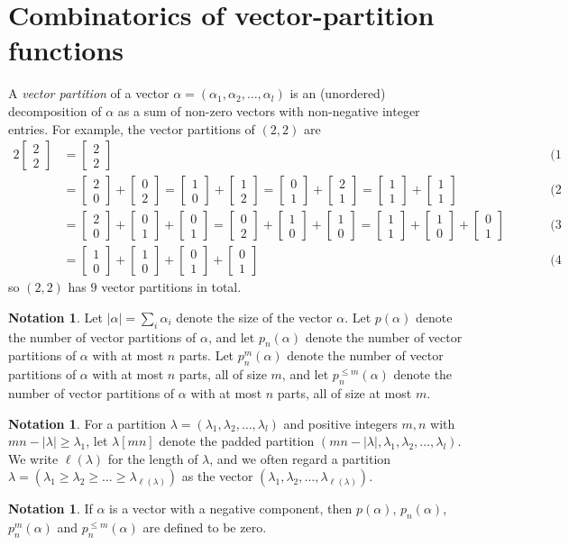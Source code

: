 \documentclass[reqno]{amsart}
\theoremstyle{plain}
\theoremstyle{definition}
\newtheorem{notation}[theorem]{Notation}
\theoremstyle{remark}
\theoremstyle{plain}
\newcommand{\vc}[2]{\begin{bmatrix}#1\\#2\end{bmatrix}}
\begin{document}
\section{Combinatorics of vector-partition functions}\label{sec-1}
A \emph{vector partition} of a vector $\alpha=(\alpha_1,\alpha_2,\ldots,\alpha_l)$
is an (unordered) decomposition of $\alpha$ as a sum of non-zero vectors with
non-negative integer entries. For example, the vector partitions of $(2,2)$ are
\begin{alignat*}{2}
\vc{2}{2} &= \vc{2}{2} && \text{(1 part)}\\[4pt]
&= \vc{2}{0}+\vc{0}{2}
 = \vc{1}{0}+\vc{1}{2}
 = \vc{0}{1}+\vc{2}{1}
 = \vc{1}{1}+\vc{1}{1} &\qquad& \text{(2 parts)}\\[4pt]
&= \vc{2}{0}+\vc{0}{1}+\vc{0}{1}
 = \vc{0}{2}+\vc{1}{0}+\vc{1}{0}
 = \vc{1}{1}+\vc{1}{0}+\vc{0}{1} && \text{(3 parts)}\\[4pt]
&= \vc{1}{0}+\vc{1}{0}+\vc{0}{1}+\vc{0}{1} && \text{(4 parts)}
\end{alignat*}
so $(2,2)$ has $9$ vector partitions in total.

\begin{notation}\label{notation-vec-par}
Let $|\alpha|=\sum_i\alpha_i$ denote the size of the vector $\alpha$. Let
$p(\alpha)$ denote the number of vector partitions of $\alpha$, and let
$p_n(\alpha)$ denote the number of vector partitions of $\alpha$ with at most
$n$ parts. Let $p_n^m(\alpha)$ denote the number of vector partitions of
$\alpha$ with at most $n$ parts, all of size $m$, and let
$p_n^{\leq m}(\alpha)$ denote the number of vector partitions of $\alpha$ with
at most $n$ parts, all of size at most $m$.
\end{notation}

\begin{notation}
For a partition $\lambda=(\lambda_1,\lambda_2,\dots,\lambda_l)$ and positive
integers $m,n$ with $mn-|\lambda|\geq\lambda_1$, let $\lambda[mn]$ denote the
padded partition $(mn-|\lambda|,\lambda_1,\lambda_2,\dots,\lambda_l)$. We write
$\ell(\lambda)$ for the length of $\lambda$, and we often regard a partition
$\lambda=(\lambda_1\geq \lambda_2\geq{\dots}\geq \lambda_{\ell(\lambda)})$ as the
vector $(\lambda_1,\lambda_2,\dots,\lambda_{\ell(\lambda)})$.
\end{notation}

\begin{notation}
If $\alpha$ is a vector with a negative component, then $p(\alpha)$,
$p_n(\alpha)$, $p_n^m(\alpha)$ and $p_n^{\le m}(\alpha)$ are defined to be zero.
\end{notation}
\end{document}
